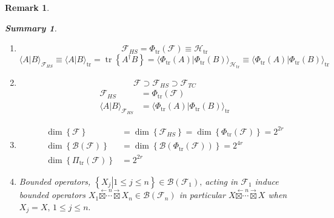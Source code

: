 \documentclass[aps, preprint]{revtex4}
\newtheorem{remark}[theorem]{Remark}
\newtheorem{summary}[theorem]{Summary}
\begin{document}
\begin{remark}
\begin{summary}
\begin{enumerate}
\item
\begin{equation}\mathcal{F}_{H S} =\Phi _{\ensuremath{\operatorname*{tr}}} \left (\mathcal{F}\right ) \equiv \mathcal{H}_{\ensuremath{\operatorname*{tr}}}
\end{equation}
\begin{equation} \langle \left .A\right \vert B \rangle _{\mathcal{F}_{H S}} \equiv  \langle \left .A\right \vert B \rangle _{\ensuremath{\operatorname*{tr}}} =\ensuremath{\operatorname*{tr}} \left \{A^{ \dag } B\right \} = \langle \left .\Phi _{\ensuremath{\operatorname*{tr}}} \left (A\right )\right \vert \Phi _{\ensuremath{\operatorname*{tr}}} \left (B\right ) \rangle _{\mathcal{H}_{\ensuremath{\operatorname*{tr}}}} \equiv  \langle \left .\Phi _{\ensuremath{\operatorname*{tr}}} \left (A\right )\right \vert \Phi _{\ensuremath{\operatorname*{tr}}} \left (B\right ) \rangle _{\ensuremath{\operatorname*{tr}}}
\end{equation}

\item
\begin{equation}\mathcal{F} \supset \mathcal{F}_{H S} \supset \mathcal{F}_{T C}
\end{equation}
\begin{align}\mathcal{F}_{H S} &  =\Phi _{\ensuremath{\operatorname*{tr}}} \left (\mathcal{F}\right ) \\
 \langle \left .A\right \vert B \rangle _{\mathcal{F}_{H S}} &  = \langle \left .\Phi _{\ensuremath{\operatorname*{tr}}} \left (A\right )\right \vert \Phi _{\ensuremath{\operatorname*{tr}}} \left (B\right ) \rangle _{\ensuremath{\operatorname*{tr}}}\end{align}

\item
\begin{align}\dim  \left \{\mathcal{F}\right \} &  =\dim  \left \{\mathcal{F}_{H S}\right \} =\dim  \left \{\Phi _{\ensuremath{\operatorname*{tr}}} \left (\mathcal{F}\right )\right \} =2^{2 r} \\
\dim  \left \{\mathcal{B} \left (\mathcal{F}\right )\right \} &  =\dim  \left \{\mathcal{B} \left (\Phi _{\ensuremath{\operatorname*{tr}}} \left (\mathcal{F}\right )\right )\right \} =2^{4 r} \\
\dim  \left \{\Pi _{\ensuremath{\operatorname*{tr}}} \left (\mathcal{F}\right )\right \} &  =2^{2 r}\end{align}

\item Bounded operators, $\left \{\left .X_{j}\right \vert 1 \leq j \leq n\right \} \in \mathcal{B} \left (\mathcal{F}_{1}\right )\text{,}$ acting in $\mathcal{F}_{1}$ induce bounded operators $X_{1} \overset{ \leftarrow n \rightarrow }{ \boxtimes \cdots  \boxtimes } X_{n} \in \mathcal{B} \left (\mathcal{F}_{n}\right )$ in particular $X \overset{ \leftarrow n \rightarrow }{ \boxtimes \cdots  \boxtimes } X$ when $X_{j} =X ,\,1 \leq j \leq n\text{.}$ 


\end{enumerate}
\end{summary}
\end{remark}
\end{document}
